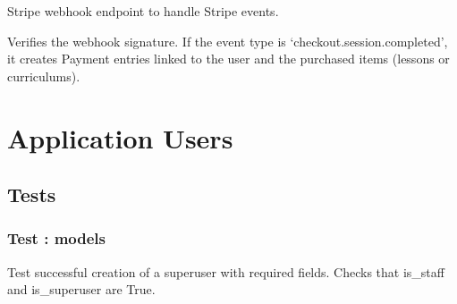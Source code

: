 \documentclass[letterpaper,10pt,english]{sphinxmanual}
\begin{document}
\begin{fulllineitems}
\label{\detokenize{payments:payments.views.stripe_webhook}}
\pysigstartsignatures
\pysiglinewithargsret
{}
{}
{}
\pysigstopsignatures
\sphinxAtStartPar
Stripe webhook endpoint to handle Stripe events.

\sphinxAtStartPar
Verifies the webhook signature. If the event type is ‘checkout.session.completed’,
it creates Payment entries linked to the user and the purchased items (lessons or curriculums).

\end{fulllineitems}


\sphinxstepscope


\chapter{Application Users}
\label{\detokenize{users:application-users}}\label{\detokenize{users::doc}}

\section{Tests}
\label{\detokenize{users:tests}}
\sphinxstepscope


\subsection{Test : models}
\label{\detokenize{users.tests:module-users.tests.test_models}}\label{\detokenize{users.tests:test-models}}\label{\detokenize{users.tests::doc}}

\begin{fulllineitems}
\label{\detokenize{users.tests:users.tests.test_models.test_create_superuser_success}}
\pysigstartsignatures
\pysiglinewithargsret
{}
{}
{}
\pysigstopsignatures
\sphinxAtStartPar
Test successful creation of a superuser with required fields.
Checks that is\_staff and is\_superuser are True.

\end{fulllineitems}
\end{document}
